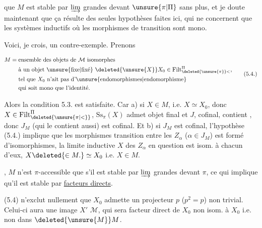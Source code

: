 
 que $M$ est stable par $\varinjlim$ grandes devant $\unsure{\pi|\Pi}$ sans plus, et je doute maintenant que ça résulte des seules hypothèses faites ici, qui ne concernent que les systèmes inductifs où les morphismes de transition sont mono.

Voici, je crois, un contre-exemple. Prenons

\[
\begin{aligned}
 M={}&\text{ensemble des objets de $\mathcal M$ isomorphes}\\
 &\text{à un objet \unsure{fixe|fixé} $\deleted{\unsure{X}}X_0\in\mathrm{Filt}^{\Pi}_{\deleted{\unsure{\pi}}<}$,}\\
 &\text{tel que $X_0$ n'ait pas d'\unsure{endomorphismes|endomorphisme}}\\
 &\text{qui soit mono que l'identité.}
\end{aligned}\tag*{(5.4.)}
\]

Alors la condition 5.3. est satisfaite. Car 
a) si $X\in M$, i.e. $X\simeq X_0$, donc $X\in\mathrm{Filt}^{\Pi}_{\deleted{\unsure{\pi|<}}}$, 
$\mathrm{Ss}_{\pi}(X)$ admet   objet final et $J$,  cofinal, contient  , donc $J_M$ (qui le contient aussi) est cofinal. Et b) si $J_M$ est cofinal,  l'hypothèse (5.4.) implique que les morphismes  transition  entre les $Z_\alpha$ ($\alpha\in J_M$) est formé d'isomorphismes,  la limite inductive $X$ des $Z_\alpha$ en question est isom. à chacun d'eux,  $X\deleted{\in M.}\simeq X_0$ i.e. $X\in M$.

, $M$ n'est $\pi$-accessible que s'il est stable par $\varinjlim$ grandes devant $\pi$, ce qui implique qu'il est stable par \uline{facteurs directs}. 


(5.4) n'exclut nullement que $X_0$ admette un projecteur $p$ ($p^2=p$) non trivial. Celui-ci aura une image $X'$  $\mathcal M$, qui sera facteur direct de $X_0$ non isom. à $X_0$ i.e. non dans $\deleted{\unsure{M}}M$.

